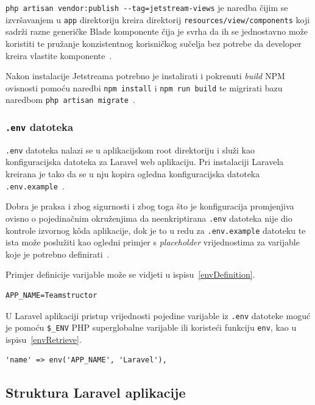 \texttt{php artisan vendor:publish -{}-tag=jetstream-views} je naredba čijim se izvršavanjem u \texttt{app} direktoriju kreira direktorij \texttt{resources/view/components} koji sadrži razne generičke Blade komponente čija je svrha da ih se jednostavno može koristiti te pružanje konzistentnog korisničkog sučelja bez potrebe da developer kreira vlastite komponente~\cite{jetstreamLivewire}.

Nakon instalacije Jetstreama potrebno je instalirati i pokrenuti \textit{build} NPM ovisnosti pomoću naredbi \texttt{npm install} i \texttt{npm run build} te migrirati bazu naredbom \texttt{php artisan migrate}~\cite{jetstreamInstallation}.

\subsubsection{\texttt{.env} datoteka}
\texttt{.env} datoteka nalazi se u aplikacijskom root direktoriju i služi kao konfiguracijska datoteka za Laravel web aplikaciju. Pri instalaciji Laravela kreirana je tako da se u nju kopira ogledna konfiguracijska datoteka \texttt{.env.example}~\cite{configuration}. 

Dobra je praksa i zbog sigurnosti i zbog toga što je konfiguracija promjenjiva ovisno o pojedinačnim okruženjima da neenkriptirana \texttt{.env} datoteka nije dio kontrole izvornog k\^oda aplikacije, dok je to u redu za \texttt{.env.example} datoteku te ista može poslužiti kao ogledni primjer s \textit{placeholder} vrijednostima za varijable koje je potrebno definirati~\cite{configuration}.

Primjer definicije varijable može se vidjeti u ispisu~\ref{envDefinition}.

\begin{lstlisting}[caption={Definicija varijable u \texttt{.env} datoteci}, label=envDefinition]
APP_NAME=Teamstructor
\end{lstlisting}

U Laravel aplikaciji pristup vrijednosti pojedine varijable iz \texttt{.env} datoteke moguć je pomoću \texttt{\$\_ENV} PHP superglobalne varijable ili koristeći funkciju \texttt{env}, kao u ispisu~\ref{envRetrieve}.

\begin{lstlisting}[caption={Pristup vrijednosti \textit{environment} varijable u Laravelu}, label=envRetrieve]
'name' => env('APP_NAME', 'Laravel'),
\end{lstlisting}

\subsection{Struktura Laravel aplikacije}

